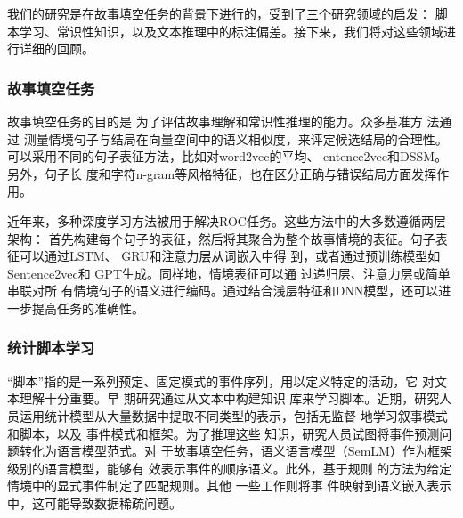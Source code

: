 我们的研究是在故事填空任务的背景下进行的，受到了三个研究领域的启发：
脚本学习、常识性知识，以及文本推理中的标注偏差。接下来，我们将对这些领域进行详细的回顾。

\subsubsection*{故事填空任务}

故事填空任务\cite{mostafazadeh2016corpus}的目的是
为了评估故事理解和常识性推理的能力。众多基准方
法\cite{mihaylov2017story,mostafazadeh2016story}通过
测量情境句子与结局在向量空间中的语义相似度，来评定候选结局的合理性。
可以采用不同的句子表征方法，比如对word2vec的平均\cite{mikolov2013distributed}、
entence2vec\cite{kiros2015skip}和DSSM\cite{huang2013learning}。另外，句子长
度和字符n-gram等风格特征，也在区分正确与错误结局方面发挥作用\cite{schwartz2017story}。

近年来，多种深度学习方法被用于解决ROC任务。这些方法中的大多数遵循两层架构：
首先构建每个句子的表征，然后将其聚合为整个故事情境的表征。句子表征可以通过LSTM、
GRU和注意力层\cite{wang2017conditional,zhou2019story}从词嵌入中得
到，或者通过预训练模型如Sentence2vec\cite{roemmele2017rnn,srinivasan2018simple}和
GPT\cite{radford2018improving,chen2018incorporating}生成。同样地，情境表征可以通
过递归层\cite{cai2017pay}、注意力层\cite{li2018multi}或简单串联\cite{bugert2017lsdsem}对所
有情境句子的语义进行编码。通过结合浅层特征和DNN模型，还可以进一步提高任务的准确性。

\subsubsection*{统计脚本学习}

``脚本''指的是一系列预定、固定模式的事件序列，用以定义特定的活动，它
对文本理解十分重要\cite{chambers2009unsupervised, regneri2011learning, schank1975scripts}。早
期研究\cite{schank2013scripts,mooney1985learning}通过从文本中构建知识
库来学习脚本。近期，研究人员运用统计模型从大量数据中提取不同类型的表示，包括无监督
地学习叙事模式和脚本\cite{chambers2009unsupervised,regneri2011learning}，以及
事件模式和框架\cite{chambers2011template,balasubramanian2013generating,sha2016joint,huang2016liberal}。为了推理这些
知识，研究人员试图将事件预测问题转化为语言模型范式\cite{pichotta2014statistical,rudinger2015script,hu2017happens}。对
于故事填空任务，语义语言模型（SemLM）\cite{peng2016two}作为框架级别的语言模型，能够有
效表示事件的顺序语义\cite{li2018multi,chaturvedi2017story}。此外，基于规则
的方法\cite{lin2017reasoning}为给定情境中的显式事件制定了匹配规则。其他
一些工作\cite{modi2014inducing,regneri-etal-2010-learning,modi2016event}则将事
件映射到语义嵌入表示中，这可能导致数据稀疏问题。

